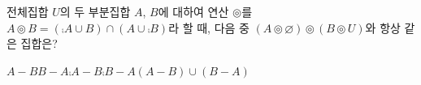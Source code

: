 전체집합 $U$의 두 부분집합 $A$, $B$에 대하여 연산 $\circledcirc$를 $A\circledcirc B=(\comp{A}\cup B)\cap(A\cup\comp{B})$라 할 때, 다음 중 $(A\circledcirc\varnothing)\circledcirc(B\circledcirc U)$와 항상 같은 집합은?
\begin{choicesii}{$A-B$}{$B-A$}{$\comp{A}-B$}{$\comp{B}-A$}{$(A-B)\cup(B-A)$}\end{choicesii}
